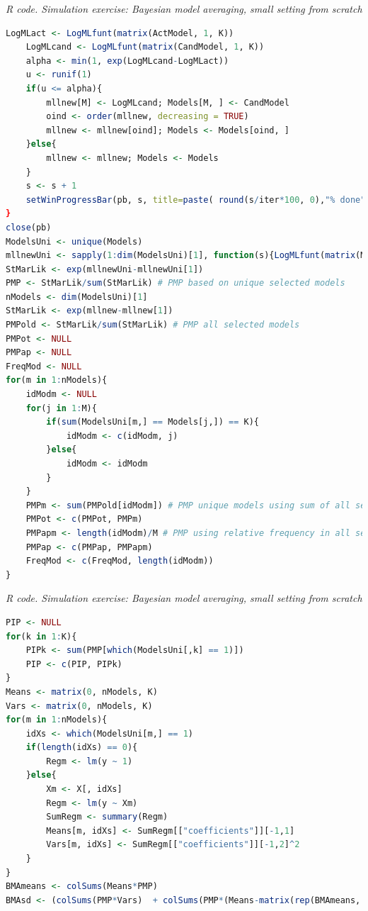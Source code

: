 \begin{tcolorbox}[enhanced,width=4.67in,center upper,
	fontupper=\large\bfseries,drop shadow southwest,sharp corners]
	\textit{R code. Simulation exercise: Bayesian model averaging, small setting from scratch}
	\begin{VF}
		\begin{lstlisting}[language=R]
	LogMLact <- LogMLfunt(matrix(ActModel, 1, K))
	LogMLcand <- LogMLfunt(matrix(CandModel, 1, K))
	alpha <- min(1, exp(LogMLcand-LogMLact))
	u <- runif(1)
	if(u <= alpha){
		mllnew[M] <- LogMLcand; Models[M, ] <- CandModel
		oind <- order(mllnew, decreasing = TRUE)
		mllnew <- mllnew[oind]; Models <- Models[oind, ]
	}else{
		mllnew <- mllnew; Models <- Models
	}
	s <- s + 1
	setWinProgressBar(pb, s, title=paste( round(s/iter*100, 0),"% done"))
}
close(pb)
ModelsUni <- unique(Models)
mllnewUni <- sapply(1:dim(ModelsUni)[1], function(s){LogMLfunt(matrix(ModelsUni[s,], 1, K))})
StMarLik <- exp(mllnewUni-mllnewUni[1])
PMP <- StMarLik/sum(StMarLik) # PMP based on unique selected models
nModels <- dim(ModelsUni)[1]
StMarLik <- exp(mllnew-mllnew[1])
PMPold <- StMarLik/sum(StMarLik) # PMP all selected models
PMPot <- NULL
PMPap <- NULL
FreqMod <- NULL
for(m in 1:nModels){
	idModm <- NULL
	for(j in 1:M){
		if(sum(ModelsUni[m,] == Models[j,]) == K){
			idModm <- c(idModm, j)
		}else{
			idModm <- idModm
		}
	}
	PMPm <- sum(PMPold[idModm]) # PMP unique models using sum of all selected models
	PMPot <- c(PMPot, PMPm)
	PMPapm <- length(idModm)/M # PMP using relative frequency in all selected models
	PMPap <- c(PMPap, PMPapm)
	FreqMod <- c(FreqMod, length(idModm))
}
\end{lstlisting}
	\end{VF}
\end{tcolorbox} 
 
\begin{tcolorbox}[enhanced,width=4.67in,center upper,
	fontupper=\large\bfseries,drop shadow southwest,sharp corners]
	\textit{R code. Simulation exercise: Bayesian model averaging, small setting from scratch}
	\begin{VF}
		\begin{lstlisting}[language=R]
PIP <- NULL
for(k in 1:K){
	PIPk <- sum(PMP[which(ModelsUni[,k] == 1)])
	PIP <- c(PIP, PIPk)
}
Means <- matrix(0, nModels, K)
Vars <- matrix(0, nModels, K)
for(m in 1:nModels){
	idXs <- which(ModelsUni[m,] == 1)
	if(length(idXs) == 0){
		Regm <- lm(y ~ 1)
	}else{
		Xm <- X[, idXs]
		Regm <- lm(y ~ Xm)
		SumRegm <- summary(Regm)
		Means[m, idXs] <- SumRegm[["coefficients"]][-1,1]
		Vars[m, idXs] <- SumRegm[["coefficients"]][-1,2]^2 
	}
}
BMAmeans <- colSums(Means*PMP)
BMAsd <- (colSums(PMP*Vars)  + colSums(PMP*(Means-matrix(rep(BMAmeans, each = nModels), nModels, K))^2))^0.5 
\end{lstlisting}
\end{VF}
\end{tcolorbox} 

